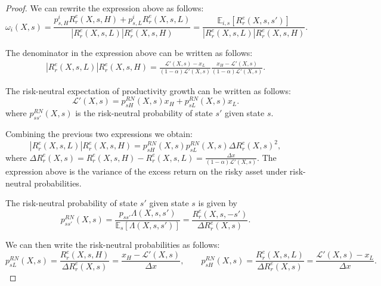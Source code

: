 \begin{proof}
We can rewrite the expression above as follows:
\begin{equation}
    \omega_i(X,s) = \frac{p_{s,H}^i R_r^e(X,s,H) + p_{s,L}^i R_r^e(X,s,L)}{|R_r^e(X,s,L)|R_r^e(X,s,H)} = \frac{\mathbb{E}_{i,s}[R_r^e(X,s,s')]}{|R_r^e(X,s,L)|R_r^e(X,s,H)}.
\end{equation}

The denominator in the expression above can be written as follows:
\begin{align}
    |R_r^e(X,s,L)|R_r^e(X,s,H) = \frac{\mathcal{L}'(X,s) - x_L}{(1-\alpha)\mathcal{L}'(X,s) } \frac{x_H - \mathcal{L}'(X,s)}{(1-\alpha)\mathcal{L}'(X,s) }.
\end{align}

The risk-neutral expectation of productivity growth can be written as follows:
\begin{equation}
    \mathcal{L}'(X,s) = p_{sH}^{RN}(X,s) x_H + p_{sL}^{RN}(X,s) x_L.
\end{equation}
where $p_{ss'}^{RN}(X,s)$ is the risk-neutral probability of state $s'$ given state $s$.

Combining the previous two expressions we obtain:
\begin{equation}
    |R_r^e(X,s,L)|R_r^e(X,s,H)= p_{sH}^{RN}(X,s) p_{sL}^{RN}(X,s) \Delta R_r^e(X,s)^2,
\end{equation}
where $\Delta R_r^e(X,s) = R_r^e(X,s,H) - R_r^e(X,s,L) = \frac{\Delta x}{(1-\alpha) \mathcal{L}'(X,s)} $. 
The expression above is the variance of the excess return on the risky asset under risk-neutral probabilities.

The risk-neutral probability of state $s'$ given state $s$ is given by
\begin{equation}
    p_{ss'}^{RN}(X,s) =\frac{p_{ss'} \Lambda(X,s,s')}{\mathbb{E}_s[\Lambda(X,s,s')]} = \frac{R_r^e(X,s,-s')}{\Delta R_r^e(X,s)}.
\end{equation}

We can then write the risk-neutral probabilities as follows:
\begin{equation}
    p_{sL}^{RN}(X,s) = \frac{R_r^e(X,s,H)}{\Delta R_r^e(X,s)} = \frac{x_H - \mathcal{L}'(X,s)}{\Delta x }, \qquad 
    p_{sH}^{RN}(X,s) = \frac{R_r^e(X,s,L)}{\Delta R_r^e(X,s)} = \frac{\mathcal{L}'(X,s)-x_L}{\Delta x }.
\end{equation}


\end{proof}
